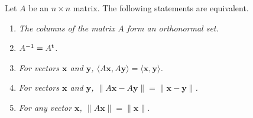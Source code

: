  
\begin{theorem}\label{matrix:orthnormal_theorem}
Let $A$ be an $n \times n$ matrix.  The following statements are
equivalent. 
\begin{enumerate}
 
\rm \item \it
The columns of the matrix $A$ form an orthonormal set.
 
\rm \item \it
$A^{-1} = A^{\rm t}$.
 
\rm \item \it
For vectors ${\mathbf x}$ and ${\mathbf y}$, $\langle  A{\mathbf x}, A
{\mathbf y} \rangle = \langle  {\mathbf x}, {\mathbf y} \rangle$.
 
\rm \item \it
For vectors ${\mathbf x}$ and ${\mathbf y}$, $\| A{\mathbf x}- A{\mathbf y} \|
=\| {\mathbf x}- {\mathbf y} \|$. 
 
\rm \item \it
For any vector ${\mathbf x}$, $\| A{\mathbf x} \| = \| {\mathbf x}\|$.
 
\end{enumerate}
\end{theorem}
 
